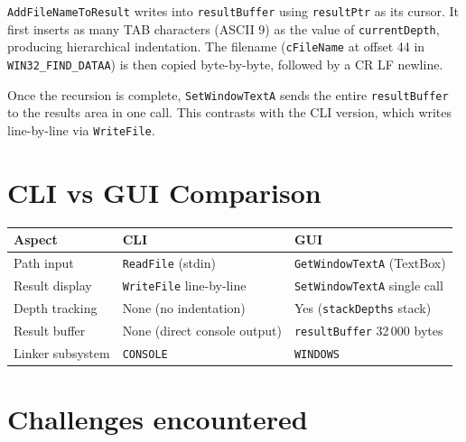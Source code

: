 \documentclass[12pt,a4paper]{article}
\begin{document}
\texttt{AddFileNameToResult} writes into \texttt{resultBuffer} using \texttt{resultPtr} as its cursor. It first inserts as many TAB characters (ASCII 9) as the value of \texttt{currentDepth}, producing hierarchical indentation. The filename (\texttt{cFileName} at offset 44 in \texttt{WIN32\_FIND\_DATAA}) is then copied byte-by-byte, followed by a CR LF newline.

Once the recursion is complete, \texttt{SetWindowTextA} sends the entire \texttt{resultBuffer} to the results area in one call. This contrasts with the CLI version, which writes line-by-line via \texttt{WriteFile}.

\section{CLI vs GUI Comparison}

\begin{center}
\begin{tabular}{lll}
\toprule
\textbf{Aspect} & \textbf{CLI} & \textbf{GUI} \\
\midrule
Path input           & \texttt{ReadFile} (stdin)       & \texttt{GetWindowTextA} (TextBox) \\
Result display       & \texttt{WriteFile} line-by-line & \texttt{SetWindowTextA} single call \\
Depth tracking       & None (no indentation)           & Yes (\texttt{stackDepths} stack) \\
Result buffer        & None (direct console output)    & \texttt{resultBuffer} 32\,000 bytes \\
Linker subsystem     & \texttt{CONSOLE}                & \texttt{WINDOWS} \\
\bottomrule
\end{tabular}
\end{center}

\section{Challenges encountered}
\end{document}
